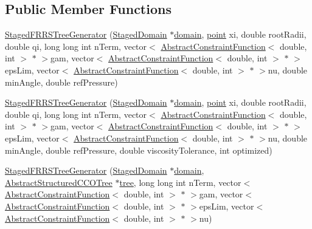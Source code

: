 \subsection*{Public Member Functions}
\begin{DoxyCompactItemize}
\item 
\hyperlink{class_staged_f_r_r_s_tree_generator_a41ad2975c756af1dbbd3e59ebcdf458b}{Staged\+F\+R\+R\+S\+Tree\+Generator} (\hyperlink{class_staged_domain}{Staged\+Domain} $\ast$\hyperlink{class_staged_f_r_r_s_tree_generator_adc8ddbcf948810b70a7f9b59237a36e2}{domain}, \hyperlink{structpoint}{point} xi, double root\+Radii, double qi, long long int n\+Term, vector$<$ \hyperlink{class_abstract_constraint_function}{Abstract\+Constraint\+Function}$<$ double, int $>$ $\ast$ $>$gam, vector$<$ \hyperlink{class_abstract_constraint_function}{Abstract\+Constraint\+Function}$<$ double, int $>$ $\ast$ $>$eps\+Lim, vector$<$ \hyperlink{class_abstract_constraint_function}{Abstract\+Constraint\+Function}$<$ double, int $>$ $\ast$ $>$nu, double min\+Angle, double ref\+Pressure)
\item 
\hyperlink{class_staged_f_r_r_s_tree_generator_a69a07c273b05c768888c5691d393efc0}{Staged\+F\+R\+R\+S\+Tree\+Generator} (\hyperlink{class_staged_domain}{Staged\+Domain} $\ast$\hyperlink{class_staged_f_r_r_s_tree_generator_adc8ddbcf948810b70a7f9b59237a36e2}{domain}, \hyperlink{structpoint}{point} xi, double root\+Radii, double qi, long long int n\+Term, vector$<$ \hyperlink{class_abstract_constraint_function}{Abstract\+Constraint\+Function}$<$ double, int $>$ $\ast$ $>$gam, vector$<$ \hyperlink{class_abstract_constraint_function}{Abstract\+Constraint\+Function}$<$ double, int $>$ $\ast$ $>$eps\+Lim, vector$<$ \hyperlink{class_abstract_constraint_function}{Abstract\+Constraint\+Function}$<$ double, int $>$ $\ast$ $>$nu, double min\+Angle, double ref\+Pressure, double viscosity\+Tolerance, int optimized)
\item 
\hyperlink{class_staged_f_r_r_s_tree_generator_a6e558409d89c7ce682d98f217955ba77}{Staged\+F\+R\+R\+S\+Tree\+Generator} (\hyperlink{class_staged_domain}{Staged\+Domain} $\ast$\hyperlink{class_staged_f_r_r_s_tree_generator_adc8ddbcf948810b70a7f9b59237a36e2}{domain}, \hyperlink{class_abstract_structured_c_c_o_tree}{Abstract\+Structured\+C\+C\+O\+Tree} $\ast$\hyperlink{class_staged_f_r_r_s_tree_generator_a584a1e0e109ac6bdeae996178f8d8646}{tree}, long long int n\+Term, vector$<$ \hyperlink{class_abstract_constraint_function}{Abstract\+Constraint\+Function}$<$ double, int $>$ $\ast$ $>$gam, vector$<$ \hyperlink{class_abstract_constraint_function}{Abstract\+Constraint\+Function}$<$ double, int $>$ $\ast$ $>$eps\+Lim, vector$<$ \hyperlink{class_abstract_constraint_function}{Abstract\+Constraint\+Function}$<$ double, int $>$ $\ast$ $>$nu)

\end{DoxyCompactItemize}
